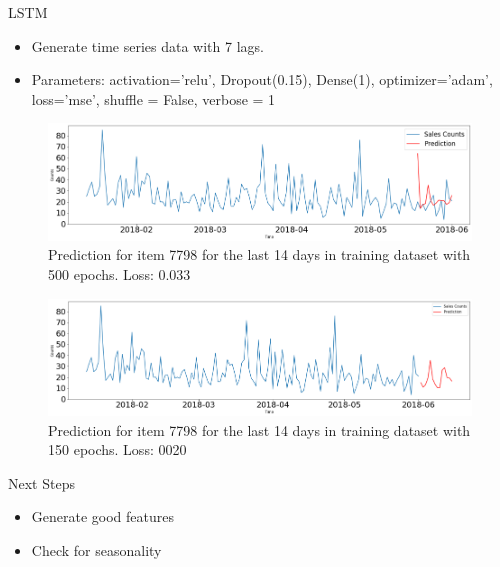 \documentclass[10pt, xcolor=dvipsnames]{beamer}
\begin{document}
\begin{frame}{LSTM}
\begin{footnotesize}
\begin{itemize}
	\item Generate time series data with 7 lags.
	\item Parameters: activation='relu', Dropout(0.15), Dense(1), optimizer='adam', loss='mse', shuffle = False, verbose = 1
\end{itemize}
\end{footnotesize}
\begin{figure}
\includegraphics[width=.8\textwidth]{lstm1.png}
\vspace{-12px}
\caption{\tiny Prediction for item 7798 for the last 14 days in training dataset with 500 epochs. Loss: 0.033}
\end{figure}
\vspace{-18px}
\begin{figure}
\includegraphics[width=.8\textwidth]{lstm2.png}
\vspace{-12px}
\caption{\tiny Prediction for item 7798 for the last 14 days in training dataset with 150 epochs. Loss: 0020}
\end{figure}

\end{frame}


\begin{frame}{Next Steps}
        \begin{itemize}
         \item Generate good features
         \item Check for seasonality
        \end{itemize}
\end{frame}
\end{document}
